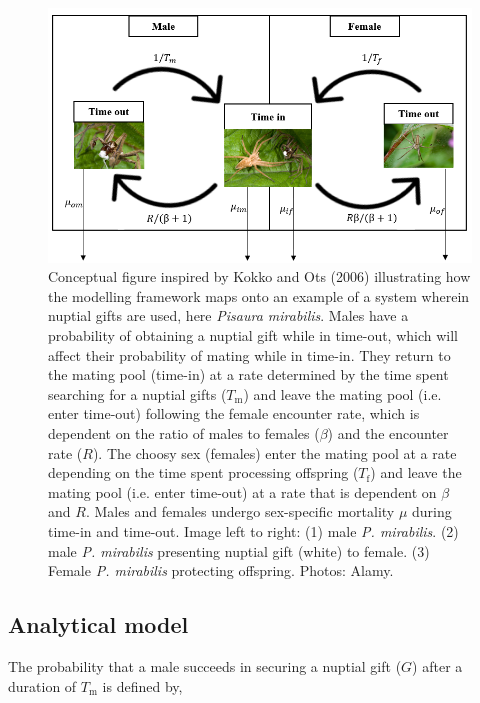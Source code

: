 \documentclass[
]{article}
\begin{document}
\begin{figure}
\includegraphics[width=1\linewidth]{inst/img/conceptual_figure} \caption{Conceptual figure inspired by Kokko and Ots (2006) illustrating how the modelling framework maps onto an example of a system wherein nuptial gifts are used, here \textit{Pisaura mirabilis}. Males have a probability of obtaining a nuptial gift while in time-out, which will affect their probability of mating while in time-in. They return to the mating pool (time-in) at a rate determined by the time spent searching for a nuptial gifts ($T_{\mathrm{m}}$) and leave the mating pool (i.e. enter time-out) following the female encounter rate, which is dependent on the ratio of males to females ($\beta$) and the encounter rate ($R$). The choosy sex (females) enter the mating pool at a rate depending on the time spent processing offspring ($T_{\mathrm{f}}$) and leave the mating pool (i.e. enter time-out) at a rate that is dependent on $\beta$ and $R$. Males and females undergo sex-specific mortality $\mu$ during time-in and time-out. Image left to right: (1) male \textit{P. mirabilis}. (2) male \textit{P. mirabilis} presenting nuptial gift (white) to female. (3) Female \textit{P. mirabilis} protecting offspring. Photos: Alamy.}\label{fig:unnamed-chunk-2}
\end{figure}

\hypertarget{analytical-model}{%
\subsection{Analytical model}\label{analytical-model}}

The probability that a male succeeds in securing a nuptial gift (\(G\))
after a duration of \(T_{\mathrm{m}}\) is defined by,
\end{document}
